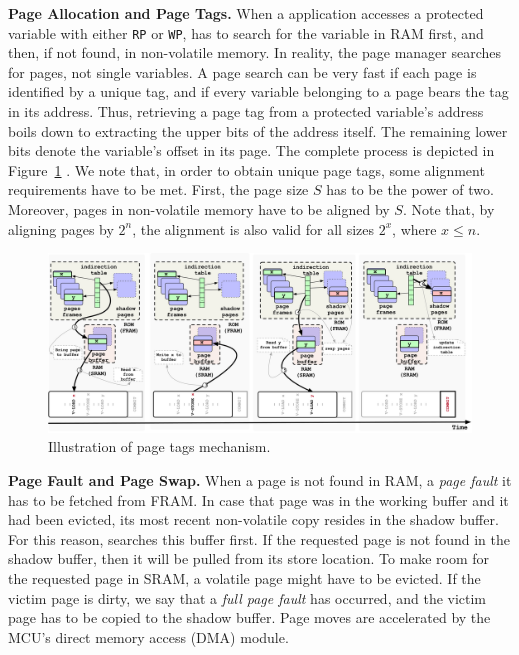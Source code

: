 \textbf{Page Allocation and Page Tags.} When a \sys application accesses a protected variable with either \texttt{RP} or \texttt{WP}, \sys has to search for the variable in RAM first, and then, if not found, in non-volatile memory. In reality, the page manager searches for pages, not single variables. A page search can be very fast if each page is identified by a unique tag, and if every variable belonging to a page bears the tag in its address. Thus, retrieving a page tag from a protected variable's address boils down to extracting the upper bits of the address itself. The remaining lower bits denote the variable's offset in its page. The complete process is depicted in Figure~\ref{figure:coala_page_tags} .
We note that, in order to obtain unique page tags, some alignment requirements have to be met. First, the page size $S$ has to be the power of two. Moreover, pages in non-volatile memory have to be aligned by $S$. Note that, by aligning pages by $2^n$, the alignment is also valid for all sizes $2^x$, where $x \leq n$.

\begin{figure}
	\centering
	\includegraphics[width=\textwidth]{figures/graffle/paging.pdf}
	\caption{Illustration of \sys page tags mechanism.}
	\label{figure:coala_page_tags}
\end{figure}

\textbf{Page Fault and Page Swap.} When a page is not found in RAM, a \emph{page fault} it has to be fetched from FRAM. In case that page was in the working buffer and it had been evicted, its most recent non-volatile copy resides in the shadow buffer. For this reason, \sys searches this buffer first. If the requested page is not found in the shadow buffer, then it will be pulled from its store location. To make room for the requested page in SRAM, a volatile page might have to be evicted. If the victim page is dirty, we say that a \emph{full page fault} has occurred, and the victim page has to be copied to the shadow buffer. Page moves are accelerated by the MCU's direct memory access (DMA) module.

